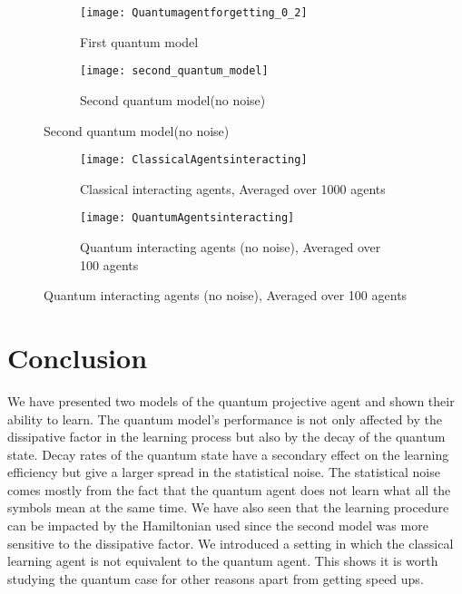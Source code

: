 \documentclass[twocolumn,prX,longbibliography]{revtex4}
\begin{document}
\begin{center}

 \begin{figure}
   \centering
   \begin{subfigure}{0.9\textwidth}
     \texttt{[image: Quantumagentforgetting\_0\_2]}
     \caption{First quantum model}
   \end{subfigure}
		 	 
	 \begin{subfigure}{0.9\textwidth}
	 	 \centering
	  	\texttt{[image: second\_quantum\_model]}
	  	\caption{Second quantum model(no noise)}
	 \end{subfigure}
\end{figure}
\end{center}


\twocolumngrid

 \onecolumngrid
 \begin{figure}[H]
  \centering
  \begin{subfigure}[b]{0.9\textwidth}
	 \texttt{[image: ClassicalAgentsinteracting]}
	\caption{Classical interacting agents, Averaged over 1000 agents} 
  \end{subfigure}
  \centering
  \begin{subfigure}[b]{0.9 \textwidth}
 \texttt{[image: QuantumAgentsinteracting]}
 \caption{Quantum interacting agents (no noise), Averaged over 100 agents}
  \end{subfigure}
   
 \end{figure}
 
 \twocolumngrid
  \section{Conclusion}
  We have presented two models of the quantum projective agent and shown their ability to learn. The quantum model's performance is not only affected by the dissipative factor in the learning process but also by the decay of the quantum state. Decay rates of the quantum state have a secondary effect on the learning efficiency but give a larger spread in the statistical noise. The statistical noise comes mostly from the fact that the quantum agent does not learn what all the symbols mean at the same time. We have also seen that the learning procedure can be impacted by the Hamiltonian used since the second model was more sensitive to the dissipative factor. We introduced a setting in which the classical learning agent is not equivalent to the quantum agent. This shows it is worth studying the quantum case for other reasons apart from getting speed ups. 



\end{document}
